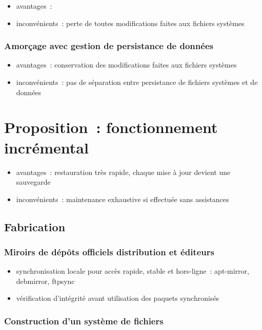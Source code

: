 \documentclass[10pt]{article}
\newenvironment{itmz}{\begin{itemize}
\setlength{\itemsep}{0em}
}{\end{itemize}}
\begin{document}
\begin{itmz}
\item{avantages :}
\item{inconvénients : perte de toutes modifications faites aux fichiers systèmes}
\end{itmz}

\subsubsection{Amorçage avec gestion de persistance de données}

\begin{itmz}
\item{avantages : conservation des modifications faites aux fichiers systèmes}
\item{inconvénients : pas de séparation entre persistance de fichiers systèmes et de données}
\end{itmz}

\section{Proposition : fonctionnement incrémental}

\begin{itmz}
\item{avantages : restauration très rapide, chaque mise à jour devient une sauvegarde}
\item{inconvénients : maintenance exhaustive si effectuée sans assistances}
\end{itmz}

\subsection{Fabrication}

\subsubsection{Miroirs de dépôts officiels distribution et éditeurs}

\begin{itmz}
\item{synchronisation locale pour accès rapide, stable et hors-ligne : apt-mirror, debmirror, ftpsync}
\item{vérification d’intégrité avant utilisation des paquets synchronisés}
\end{itmz}

\subsubsection{Construction d’un système de fichiers}
\end{document}
